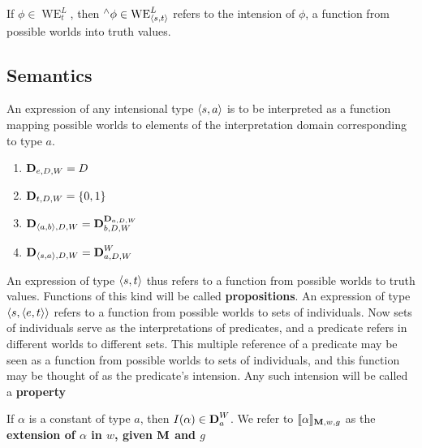\documentclass[11pt]{article}
\DeclareMathOperator{\WE}{WE}
\begin{document}
If \(\phi\in\WE_t^L\), then \({}^\wedge\phi\in\WE_{\la s,t\ra}^L\) refers to
the intension of \(\phi\), a function from possible worlds into truth values.
\subsection{Semantics}
\label{sec:orgf4efa98}
An expression of any intensional type \(\langle s,a\rangle\) is to be interpreted as
a function mapping possible worlds to elements of the interpretation domain
corresponding to type \(a\).

\begin{definition}[]
\begin{enumerate}
\item \(\operatorname{\textbf{D}}_{e,D,W}=D\)
\item \(\operatorname{\textbf{D}}_{t,D,W}=\{0,1\}\)
\item \(\operatorname{\textbf{D}}_{\langle a,b\rangle,D,W}=\operatorname{\textbf{D}}_{b,D,W}^{\operatorname{\textbf{D}}_{a,D,W}}\)
\item \(\operatorname{\textbf{D}}_{\langle s,a\rangle,D,W}=\operatorname{\textbf{D}}_{a,D,W}^W\)
\end{enumerate}
\end{definition}

An expression of type \(\langle s,t\rangle\) thus refers to a function from possible
worlds to truth values. Functions of this kind will be called \textbf{propositions}.
An expression of type \(\langle s,\langle e,t\rangle\rangle\) refers to a function from
possible worlds to sets of individuals. Now sets of individuals serve as the
interpretations of predicates, and a predicate refers in different worlds to
different sets. This multiple reference of a predicate may be seen as a
function from possible worlds to sets of individuals, and this function may
be thought of as the predicate's intension. Any such intension will be called
a \textbf{property}

If \(\alpha\) is a constant of  type \(a\), then \(I(\alpha)\in\operatorname{\textbf{D}}_a^W\). We refer to
\(\llbracket\alpha\rrbracket_{\operatorname{\textbf{M}},w,g}\) as the
\textbf{extension of \(\alpha\) in \(w\), given \(\operatorname{\textbf{M}}\) and \(g\)}
\end{document}
